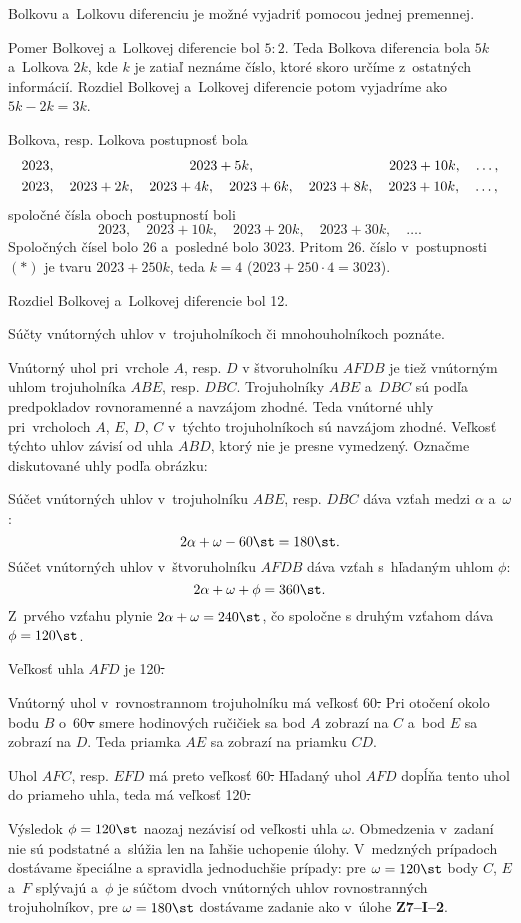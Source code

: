 {%
\napad
Bolkovu a~Lolkovu diferenciu je možné vyjadriť pomocou jednej premennej.

\riesenie
Pomer Bolkovej a~Lolkovej diferencie bol $5:2$.
Teda Bolkova diferencia bola $5k$ a~Lolkova $2k$, kde $k$ je zatiaľ neznáme číslo, ktoré skoro určíme z~ostatných informácií.
Rozdiel Bolkovej a~Lolkovej diferencie potom vyjadríme ako $5k-2k=3k$.

Bolkova, resp. Lolkova postupnosť bola
$$ \aligned
& 2023,\hskip96pt 2023+5k,\hskip96pt 2023+10k,\quad \dots , \\
& 2023,\quad 2023+2k,\quad 2023+4k,\quad 2023+6k,\quad 2023+8k,\quad 2023+10k,\quad \dots ,
\endaligned
$$
spoločné čísla oboch postupností boli
$$
2023, \quad 2023 + 10k, \quad 2023 +20k, \quad 2023 +30k, \quad \dots . \tag{$*$}
$$
Spoločných čísel bolo 26 a~posledné bolo 3023.
Pritom 26. číslo v~postupnosti $(*)$ je tvaru $2023+250k$, teda $k=4$ ($2023+250\cdot4=3023$).

Rozdiel Bolkovej a~Lolkovej diferencie bol 12.}

{%
\napad
Súčty vnútorných uhlov v~trojuholníkoch či mnohouholníkoch poznáte.

\riesenie
Vnútorný uhol pri~vrchole $A$, resp. $D$ v štvoruholníku $AFDB$ je tiež vnútorným uhlom trojuholníka $ABE$, resp. $DBC$.
Trojuholníky $ABE$ a~$DBC$ sú podľa predpokladov rovnoramenné a navzájom zhodné.
Teda vnútorné uhly pri~vrcholoch $A$, $E$, $D$, $C$ v~týchto trojuholníkoch sú navzájom zhodné.
Veľkosť týchto uhlov závisí od uhla $ABD$, ktorý nie je presne vymedzený.
Označme diskutované uhly podľa obrázku:
%

Súčet vnútorných uhlov v~trojuholníku $ABE$, resp. $DBC$ dáva vzťah medzi $\alpha$ a~$\omega$:
$$
2\alpha+\omega-60\st=180\st .
$$
Súčet vnútorných uhlov v~štvoruholníku $AFDB$ dáva vzťah s~hľadaným uhlom $\phi$:
$$
2\alpha+\omega+\phi=360\st.
$$
Z~prvého vzťahu plynie $2\alpha+\omega=240\st$, čo spoločne s druhým vzťahom dáva $\phi=120\st$.

Veľkosť uhla $AFD$ je 120\st.

\ineriesenie
Vnútorný uhol v~rovnostrannom trojuholníku má veľkosť 60\st.
Pri otočení okolo bodu $B$ o~60\st v smere hodinových ručičiek sa bod $A$ zobrazí na $C$ a~bod $E$ sa zobrazí na $D$.
Teda priamka $AE$ sa zobrazí na priamku $CD$.

Uhol $AFC$, resp. $EFD$ má preto veľkosť 60\st.
Hľadaný uhol $AFD$ dopĺňa tento uhol do priameho uhla, teda má veľkosť 120\st.

\poznamka
Výsledok $\phi=120\st$ naozaj nezávisí od veľkosti uhla $\omega$.
Obmedzenia v~zadaní nie sú podstatné a~slúžia len na ľahšie uchopenie úlohy.
V~medzných prípadoch dostávame špeciálne a spravidla jednoduchšie prípady:
pre $\omega=120\st$ body $C$, $E$ a~$F$ splývajú a~$\phi$ je súčtom dvoch vnútorných uhlov rovnostranných trojuholníkov,
pre $\omega=180\st$ dostávame zadanie ako v~úlohe {\bf Z7--I--2}.}

